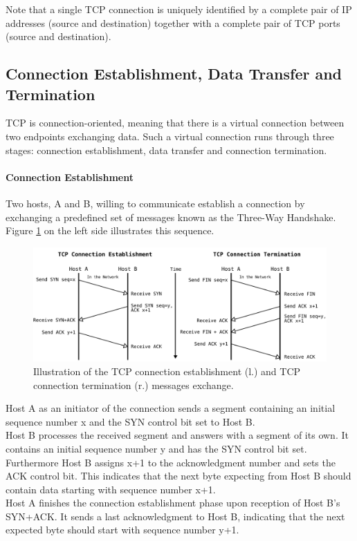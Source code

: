 Note that a single TCP connection is uniquely identified by a complete pair of IP addresses (source and destination) together with a complete pair of TCP ports (source and destination).

\subsection*{Connection Establishment, Data Transfer and Termination}

TCP is connection-oriented, meaning that there is a virtual connection between two endpoints exchanging data. Such a virtual connection runs through three stages: connection establishment, data transfer and connection termination.

\paragraph{Connection Establishment}

Two hosts, A and B, willing to communicate establish a connection by exchanging a predefined set of messages known as the Three-Way Handshake. Figure \ref{fig:TCPConnectionEstablishmentAndTermination} on the left side illustrates this sequence. 

\begin{figure}[H]
	\begin{center} 
		\def\svgwidth{1\textwidth}
		\includegraphics[scale=0.24]{../illustrations/importantConcepts/TCPHandshake.pdf} 
		\caption[]{Illustration of the TCP connection establishment (l.) and TCP connection termination (r.) messages exchange.}
		\label{fig:TCPConnectionEstablishmentAndTermination}
	\end{center}
\end{figure}

Host A as an initiator of the connection sends a segment containing an initial sequence number x and the SYN control bit set to Host B. \smallskip\\Host B processes the received segment and answers with a segment of its own. It contains an initial sequence number y and has the SYN control bit set. Furthermore Host B assigns x+1 to the acknowledgment number and sets the ACK control bit. This indicates that the next byte expecting from Host B should contain data starting with sequence number x+1. \smallskip\\ Host A finishes the connection establishment phase upon reception of Host B's SYN+ACK. It sends a last acknowledgment to Host B, indicating that the next expected byte should start with sequence number y+1.

